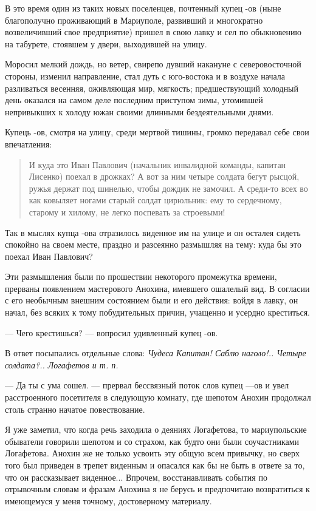 \documentclass[a4paper,20pt]{article}
\begin{document}
В это время один из таких новых поселенцев,
почтенный купец -ов (ныне благополучно проживающий
в Мариуполе, развивший и многократно возвеличивший свое
предприятие) пришел в свою лавку и сел по обыкновению
на табурете, стоявшем у двери, выходившей на улицу. 

Моросил мелкий дождь, но ветер, свирепо дувший накануне с северовосточной
стороны, изменил направление, стал дуть с юго-востока и в воздухе начала
разливаться весенняя, оживляющая мир, мягкость; предшествующий холодный день
оказался на самом деле последним приступом зимы, утомившей непривыкших к холоду
южан своими длинными бездеятельными днями.

Купець -ов, смотря на улицу, среди мертвой тишины, 
громко передавал себе свои впечатления: 

\begin{quote}
\em\bfseries

И куда это
Иван Павлович (начальник инвалидной команды, капитан Лисенко) поехал в дрожках?
А вот за ним четыре солдата бегут рысцой, ружья держат под шинелью, чтобы дождик не замочил. А среди-то всех во как
ковыляет ногами старый солдат цирюльник: ему то сердечному, старому и хилому, не легко поспевать за строевыми!
\end{quote}

Так в мыслях купца -ова отразилось виденное
им на улице и он осталея сидеть спокойно на своем
месте, праздно и разсеянно размышляя на тему: куда бы это
поехал Иван Павлович?

Эти размышления были по прошествии некоторого промежутка времени, прерваны появлением мастерового 
Анохина, имевшего ошалелый вид. В согласии с его необычным внешним состоянием были и его действия: войдя в лавку, 
он начал, без всяких к тому побудительных причин, учащенно и усердно креститься.

— Чего крестишься? — вопросил удивленный купец -ов.

В ответ посыпались отдельные слова: \emph{Чудеса Капитан! Саблю наголо!..
Четыре солдата?.. Логафетов и т. п.}

— Да ты с ума сошел. — прервал бессвязный поток слов купец —ов и увел расстроенного 
посетителя в следующую комнату, где шепотом Анохин продолжал столь странно начатое  
повествование.

Я уже заметил, что когда речь заходила о деяниях Логафетова, то мариупольские
обыватели говорили шепотом и со страхом, как будто они были
соучастниками Логафетова. Анохин же не только усвоить эту общую всем
привычку, но сверх того был приведен в трепет виденным и опасался как
бы не быть в ответе за то, что он рассказывает виденное... Впрочем,
восстанавливать события по отрывочным словам и фразам Анохина я не берусь
и предпочитаю возвратиться к имеющемуся у меня точному, достоверному
материалу.
\end{document}
